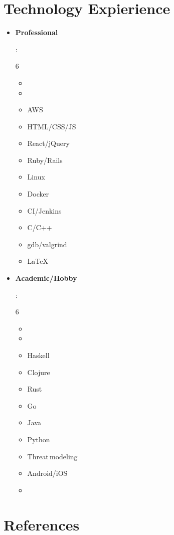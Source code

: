 \documentclass[letterpaper,11pt]{article}
\newcommand{\resumeItem}[2]{
  \item\small{
    \textbf{#1}{: #2 \vspace{-2pt}}
  }
}
\newcommand{\resumeReference}[4]{
  \vspace{-1pt}\item
    \textbf{#1} - \textit{\small#2} \dotfill #3 - #4
  \vspace{-5pt}
}
\newcommand{\resumeSubItem}[2]{\resumeItem{#1}{#2}\vspace{-4pt}}
\newcommand{\resumeSubHeadingListStart}{\begin{itemize}[leftmargin=*]}
\newcommand{\resumeSubHeadingListEnd}{\end{itemize}}
\newcommand{\resumeListMulticolStart}[1]{
  \vspace{-2.4em}
  \setlength{\columnsep}{-1pc}
  \begin{multicols}{#1}
    \begin{itemize}[label={}]
      \item
}
\newcommand{\resumeListMulticolEnd}{
    \end{itemize}
  \end{multicols}
  \vspace{-10pt}
}
\begin{document}
\section{Technology Expierience}
  \resumeSubHeadingListStart

  \resumeSubItem{Professional}
    {
      \resumeListMulticolStart{6}
        \item %
        \item AWS
        \item HTML/CSS/JS
        \item React/jQuery
        \item Ruby/Rails
        \item Linux
        \item Docker
        \item CI/Jenkins
        \item C/C++
        \item gdb/valgrind
        \item \LaTeX
      \resumeListMulticolEnd
    }
  \resumeSubItem{Academic/Hobby}
    {
      \resumeListMulticolStart{6}
        \item %
        \item Haskell
        \item Clojure
        \item Rust
        \item Go
        \item Java
        \item Python
        \item Threat\,modeling
        \item Android/iOS
        \item %
      \resumeListMulticolEnd
    }
  \resumeSubHeadingListEnd


\section{References}
\resumeSubHeadingListStart
  
\resumeSubHeadingListEnd


\end{document}
